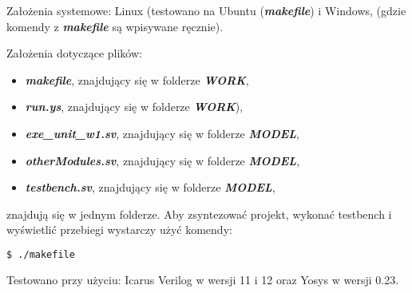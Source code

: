\noindent
Założenia systemowe: Linux (testowano na Ubuntu (\textbf{\emph{makefile}}) i Windows, (gdzie komendy z \textbf{\emph{makefile}} są wpisywane ręcznie).

\bigskip

\noindent
Założenia dotyczące plików:
\begin{itemize}
	\item \textbf{\emph{makefile}}, znajdujący się w folderze \textbf{\emph{WORK}},
	\item \textbf{\emph{run.ys}}, znajdujący się w folderze \textbf{\emph{WORK}}),
	\item \textbf{\emph{exe\_unit\_w1.sv}}, znajdujący się w folderze \textbf{\emph{MODEL}},
	\item \textbf{\emph{otherModules.sv}}, znajdujący się w folderze \textbf{\emph{MODEL}},
	\item \textbf{\emph{testbench.sv}}, znajdujący się w folderze \textbf{\emph{MODEL}},
\end{itemize}

\noindent
znajdują się w jednym folderze. Aby zsyntezować projekt, wykonać testbench i wyświetlić przebiegi wystarczy użyć komendy:


\begin{lstlisting}[language=bash, style=rm]
		$ ./makefile
\end{lstlisting}

\bigskip

\noindent
Testowano przy użyciu: Icarus Verilog w wersji 11 i 12 oraz Yosys w wersji 0.23.